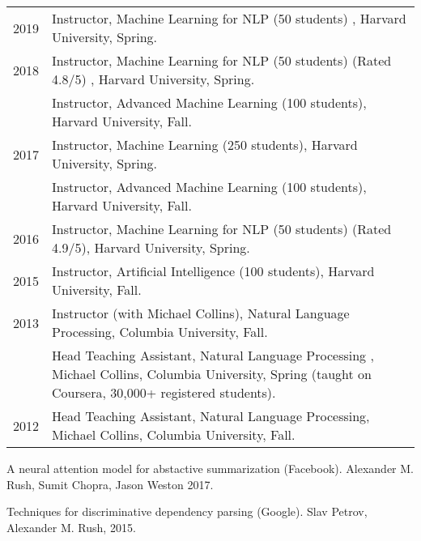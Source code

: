 \documentclass[10pt]{article}
\begin{document}
{\begin{tabular}{lp{11.5cm}}
	2019      & \ind  Instructor, Machine Learning for NLP (50 students) , Harvard University, Spring.                                                                      \\

	2018      & \ind  Instructor, Machine Learning for NLP (50 students) (Rated 4.8/5) , Harvard University, Spring.                                                        \\
	          & \ind  Instructor, Advanced Machine Learning (100 students), Harvard University, Fall.                                                                       \\
	2017      & \ind  Instructor, Machine Learning (250 students), Harvard University, Spring.                                                                              \\
	          & \ind  Instructor, Advanced Machine Learning (100 students), Harvard University, Fall.                                                                       \\
	2016      & \ind  Instructor, Machine Learning for NLP (50 students) (Rated 4.9/5), Harvard University, Spring.                                                         \\
	2015      & \ind  Instructor, Artificial Intelligence (100 students), Harvard University, Fall.                                                                         \\
	2013      & \ind  Instructor (with Michael Collins), Natural Language Processing, Columbia University, Fall.                                                            \\
	          & \ind Head Teaching Assistant, Natural Language Processing , Michael Collins, Columbia University, Spring (taught on Coursera, 30,000+ registered students). \\
	2012      & \ind Head Teaching Assistant, Natural Language Processing, Michael Collins, Columbia University, Fall.                                                      \\
\end{tabular}

\bigskip
{}

\ind A neural attention model for abstactive summarization (Facebook). Alexander M. Rush, Sumit Chopra, Jason Weston 2017.
\medskip

\ind Techniques for discriminative dependency parsing (Google). Slav Petrov, Alexander M. Rush, 2015.
\medskip

}
\end{document}

